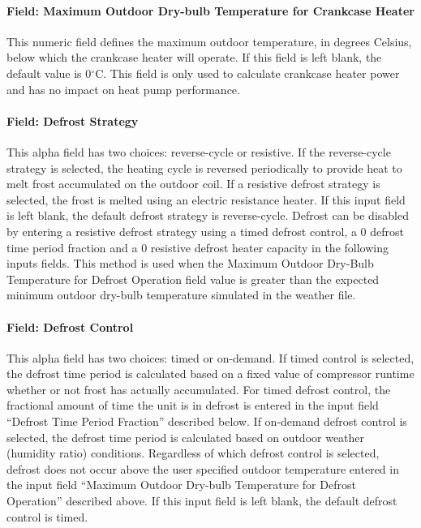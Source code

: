 \paragraph{Field: Maximum Outdoor Dry-bulb Temperature for Crankcase Heater}\label{field-maximum-outdoor-dry-bulb-temperature-for-crankcase-heater-000}

This numeric field defines the maximum outdoor temperature, in degrees Celsius, below which the crankcase heater will operate. If this field is left blank, the default value is 0$^\circ$C. This field is only used to calculate crankcase heater power and has no impact on heat pump performance.

\paragraph{Field: Defrost Strategy}\label{field-defrost-strategy-001}

This alpha field has two choices: reverse-cycle or resistive. If the reverse-cycle strategy is selected, the heating cycle is reversed periodically to provide heat to melt frost accumulated on the outdoor coil. If a resistive defrost strategy is selected, the frost is melted using an electric resistance heater. If this input field is left blank, the default defrost strategy is reverse-cycle. Defrost can be disabled by entering a resistive defrost strategy using a timed defrost control, a 0 defrost time period fraction and a 0 resistive defrost heater capacity in the following inputs fields. This method is used when the Maximum Outdoor Dry-Bulb Temperature for Defrost Operation field value is greater than the expected minimum outdoor dry-bulb temperature simulated in the weather file.

\paragraph{Field: Defrost Control}\label{field-defrost-control-001}

This alpha field has two choices: timed or on-demand. If timed control is selected, the defrost time period is calculated based on a fixed value of compressor runtime whether or not frost has actually accumulated. For timed defrost control, the fractional amount of time the unit is in defrost is entered in the input field ``Defrost Time Period Fraction'' described below. If on-demand defrost control is selected, the defrost time period is calculated based on outdoor weather (humidity ratio) conditions. Regardless of which defrost control is selected, defrost does not occur above the user specified outdoor temperature entered in the input field ``Maximum Outdoor Dry-bulb Temperature for Defrost Operation'' described above. If this input field is left blank, the default defrost control is timed.


